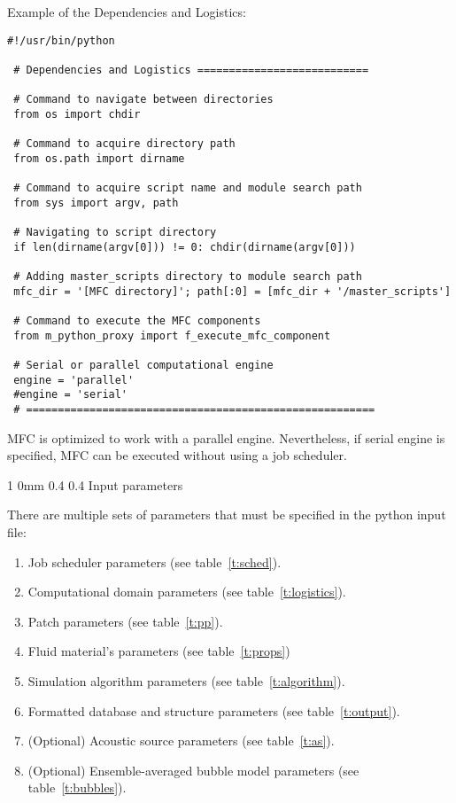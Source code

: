 \documentclass[11pt]{article}
\makeatletter
\renewcommand{\subsection}{\@startsection
{subsection}%
{1}%
{0mm}%
{0.4\baselineskip}%
{0.4\baselineskip}%
{\normalfont\large\bfseries\color{myBrown}}}%
\makeatother
\begin{document}
Example of the Dependencies and Logistics:\\
\begin{lstlisting}[style=BashInputStyle]
 #!/usr/bin/python
  
 # Dependencies and Logistics ===========================

 # Command to navigate between directories
 from os import chdir

 # Command to acquire directory path
 from os.path import dirname

 # Command to acquire script name and module search path
 from sys import argv, path

 # Navigating to script directory
 if len(dirname(argv[0])) != 0: chdir(dirname(argv[0]))

 # Adding master_scripts directory to module search path
 mfc_dir = '[MFC directory]'; path[:0] = [mfc_dir + '/master_scripts']

 # Command to execute the MFC components
 from m_python_proxy import f_execute_mfc_component

 # Serial or parallel computational engine
 engine = 'parallel'
 #engine = 'serial'
 # =======================================================
\end{lstlisting}

MFC is optimized to work with a parallel engine.
Nevertheless, if serial engine is specified, MFC can be executed without using a job scheduler.

\subsection{Input parameters}

There are multiple sets of parameters that must be specified in the python input file:
\begin{enumerate}
	\item Job scheduler parameters (see table~\ref{t:sched}).
	\item Computational domain parameters (see table~\ref{t:logistics}).
	\item Patch parameters (see table~\ref{t:pp}).
	\item Fluid material's parameters (see table~\ref{t:props})
	\item Simulation algorithm parameters (see table~\ref{t:algorithm}).
	\item Formatted database and structure parameters (see table~\ref{t:output}).
    \item (Optional) Acoustic source parameters (see table~\ref{t:as}).
	\item (Optional) Ensemble-averaged bubble model parameters (see table~\ref{t:bubbles}).
\end{enumerate}
\end{document}
